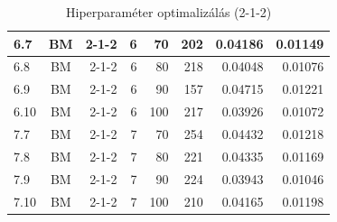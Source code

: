 \documentclass[a4paper, magyar]{article}
\begin{document}
\begin{small}
\begin{table}[tp]
\begin{tabular}{|l|c|r|r|r|r|r|r|}
		\hline
		6.7&BM&2-1-2&6&70&202&0.04186&0.01149\\
		\hline
		6.8&BM&2-1-2&6&80&218&0.04048&0.01076\\
		\hline
		6.9&BM&2-1-2&6&90&157&0.04715&0.01221\\
		\hline
		6.10&BM&2-1-2&6&100&217&0.03926&0.01072\\
		\hline
		7.7&BM&2-1-2&7&70&254&0.04432&0.01218\\
		\hline
		7.8&BM&2-1-2&7&80&221&0.04335&0.01169\\
		\hline
		7.9&BM&2-1-2&7&90&224&0.03943&0.01046\\
		\hline
		7.10&BM&2-1-2&7&100&210&0.04165&0.01198\\
		\hline
	\end{tabular}

	
	\caption{Hiperparaméter optimalizálás (2-1-2)}
	\label{tab:optim}
\end{table}
\end{small}
\end{document}
